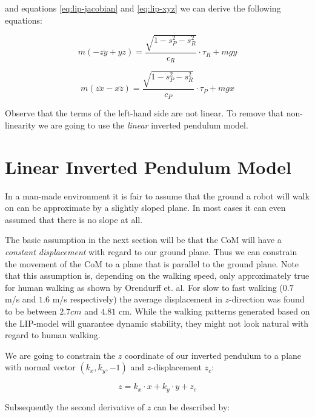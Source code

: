 \documentclass[english,ngerman]{KITreprt}
\newcommand{\clr}[2]{{\color{#1}{#2}}}
\newcommand{\todo}[1]{\marginpar{\clr{red}{#1}}}
\begin{document}
and equations \ref{eq:lip-jacobian} and \ref{eq:lip-xyz} we can derive
the following equations:

\begin{equation} \label{eq:lip-dyn-y}
m(-z\ddot{y} + y\ddot{z}) = \frac{\sqrt{1 - s_P^2 - s_R^2}}{c_R} \cdot \tau_R + m g y
\end{equation}

\begin{equation} \label{eq:lip-dyn-x}
m(z\ddot{x} - x\ddot{z}) = \frac{\sqrt{1 - s_P^2 - s_R^2}}{c_P} \cdot \tau_P + m g x
\end{equation}

Observe that the terms of the left-hand side are not linear. To remove
that non-linearity we are going to use the \emph{linear} inverted
pendulum model.

\section{Linear Inverted Pendulum
Model}\label{linear-inverted-pendulum-model}

In a man-made environment it is fair to assume that the ground a robot
will walk on can be approximate by a slightly sloped plane. In most
cases it can even assumed that there is no slope at all.

The basic assumption in the next section will be that the CoM will have
a \emph{constant displacement} with regard to our ground plane. Thus we
can constrain the movement of the CoM to a plane that is parallel to the
ground plane. Note that this assumption is, depending on the walking
speed, only approximately true for human walking as shown by Orendurff
et. al. For slow to fast walking ($0.7$ m/s and $1.6$ m/s respectively)
the average displacement in $z$-direction was found to be between
$2.7cm$ and $4.81$ cm. While the walking patterns generated based on the
LIP-model will guarantee dynamic stability, they might not look natural
with regard to human walking.

\todo{cite Orendurff}

We are going to constrain the $z$ coordinate of our inverted pendulum to
a plane with normal vector $(k_x, k_y, -1)$ and $z$-displacement $z_c$:

\begin{equation} \label{eq:lip-z-plane}
z = k_x \cdot x + k_y \cdot y + z_c
\end{equation}

Subsequently the second derivative of $z$ can be described by:
\end{document}
